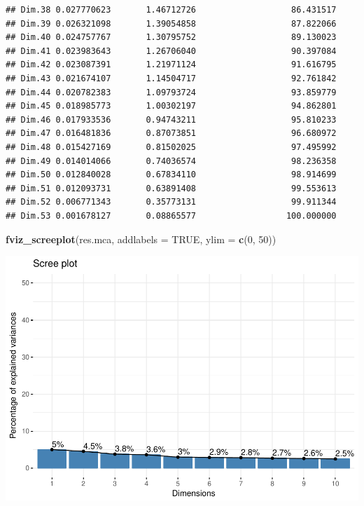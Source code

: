 \documentclass[11pt,]{article}
\newenvironment{Shaded}{\begin{snugshade}}{\end{snugshade}}
\newcommand{\DataTypeTok}[1]{\textcolor[rgb]{0.13,0.29,0.53}{#1}}
\newcommand{\DecValTok}[1]{\textcolor[rgb]{0.00,0.00,0.81}{#1}}
\newcommand{\KeywordTok}[1]{\textcolor[rgb]{0.13,0.29,0.53}{\textbf{#1}}}
\newcommand{\NormalTok}[1]{#1}
\newcommand{\OtherTok}[1]{\textcolor[rgb]{0.56,0.35,0.01}{#1}}
\begin{document}
\begin{verbatim}
## Dim.38 0.027770623       1.46712726                   86.431517
## Dim.39 0.026321098       1.39054858                   87.822066
## Dim.40 0.024757767       1.30795752                   89.130023
## Dim.41 0.023983643       1.26706040                   90.397084
## Dim.42 0.023087391       1.21971124                   91.616795
## Dim.43 0.021674107       1.14504717                   92.761842
## Dim.44 0.020782383       1.09793724                   93.859779
## Dim.45 0.018985773       1.00302197                   94.862801
## Dim.46 0.017933536       0.94743211                   95.810233
## Dim.47 0.016481836       0.87073851                   96.680972
## Dim.48 0.015427169       0.81502025                   97.495992
## Dim.49 0.014014066       0.74036574                   98.236358
## Dim.50 0.012840028       0.67834110                   98.914699
## Dim.51 0.012093731       0.63891408                   99.553613
## Dim.52 0.006771343       0.35773131                   99.911344
## Dim.53 0.001678127       0.08865577                  100.000000
\end{verbatim}

\begin{Shaded}
\begin{Highlighting}[]
\KeywordTok{fviz_screeplot}\NormalTok{(res.mca, }\DataTypeTok{addlabels =} \OtherTok{TRUE}\NormalTok{, }\DataTypeTok{ylim =} \KeywordTok{c}\NormalTok{(}\DecValTok{0}\NormalTok{, }\DecValTok{50}\NormalTok{))}
\end{Highlighting}
\end{Shaded}

\includegraphics{describe_FSMintentions_regional_seasonal_iDE-Camb_surveysOct2017_files/figure-latex/MCA_results-1.pdf}
\end{document}
